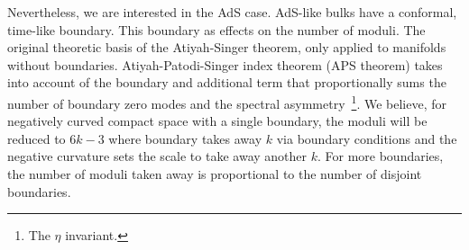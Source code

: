 \documentclass[12pt]{article}
\begin{document}
Nevertheless, we are interested in the AdS case. 
AdS-like bulks have a conformal, time-like boundary.
This boundary as effects on the number of moduli.
The original theoretic basis of the Atiyah-Singer theorem, only applied to manifolds without boundaries. 
Atiyah-Patodi-Singer index theorem (APS theorem) takes into account of the boundary and additional term that proportionally sums the number of boundary zero modes and the spectral asymmetry\
  \footnote{The $\eta$ invariant.}.
We believe, for negatively curved compact space with a single boundary, the moduli will be reduced to $6k - 3$ where boundary takes away $k$ via boundary conditions and the negative curvature sets the scale to take away another $k$.
For more boundaries, the number of moduli taken away is proportional to the number of disjoint boundaries.
\end{document}
